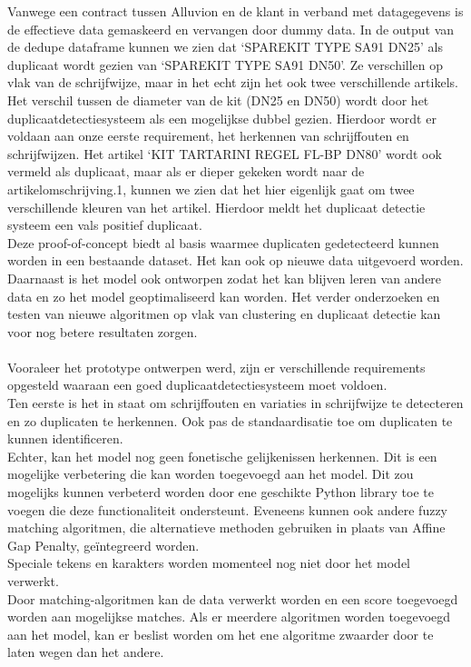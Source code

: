 Vanwege een contract tussen Alluvion en de klant in verband met datagegevens is de effectieve data gemaskeerd en vervangen door dummy data. In de output van de dedupe dataframe kunnen we zien dat ‘SPAREKIT TYPE SA91 DN25’ als duplicaat wordt gezien van ‘SPAREKIT TYPE SA91 DN50’. Ze verschillen op vlak van de schrijfwijze, maar in het echt zijn het ook twee verschillende artikels. Het verschil tussen de diameter van de kit (DN25 en DN50) wordt door het duplicaatdetectiesysteem als een mogelijkse dubbel gezien. Hierdoor wordt er voldaan aan onze eerste requirement, het herkennen van schrijffouten en schrijfwijzen. Het artikel ‘KIT TARTARINI REGEL FL-BP DN80’ wordt ook vermeld als duplicaat, maar als er dieper gekeken wordt naar de artikelomschrijving.1, kunnen we zien dat het hier eigenlijk gaat om twee verschillende kleuren van het artikel. Hierdoor meldt het duplicaat detectie systeem een vals positief duplicaat. 
\\Deze proof-of-concept biedt al basis waarmee duplicaten gedetecteerd kunnen worden in een bestaande dataset. Het kan ook op nieuwe data uitgevoerd worden. Daarnaast is het model ook ontworpen zodat het kan blijven leren van andere data en zo het model geoptimaliseerd kan worden. Het verder onderzoeken en testen van nieuwe algoritmen op vlak van clustering en duplicaat detectie kan voor nog betere resultaten zorgen. 
\\ \\Vooraleer het prototype ontwerpen werd, zijn er verschillende requirements opgesteld waaraan een goed duplicaatdetectiesysteem moet voldoen.
\\Ten eerste is het in staat om schrijffouten en variaties in schrijfwijze te detecteren en zo duplicaten te herkennen. Ook pas de standaardisatie toe om duplicaten te kunnen identificeren.
\\Echter, kan het model nog geen fonetische gelijkenissen herkennen. Dit is een mogelijke verbetering die kan worden toegevoegd aan het model. Dit zou mogelijks kunnen verbeterd worden door ene geschikte Python library toe te voegen die deze functionaliteit ondersteunt. Eveneens kunnen ook andere fuzzy matching algoritmen, die alternatieve methoden gebruiken in plaats van Affine Gap Penalty, geïntegreerd worden.
\\Speciale tekens en karakters worden momenteel nog niet door het model verwerkt.
\\Door matching-algoritmen kan de data verwerkt worden en een score toegevoegd worden aan mogelijkse matches. Als er meerdere algoritmen worden toegevoegd aan het model, kan er beslist worden om het ene algoritme zwaarder door te laten wegen dan het andere. 